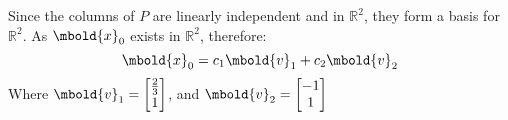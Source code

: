 \documentclass[12pt letter]{report}
\begin{document}
{  Since the columns of $P$ are linearly independent and in $\mathbb{R}^2$, they form a basis for $\mathbb{R}^2$. As
  $\mbold{x}_0$ exists in $\mathbb{R}^2$, therefore:
  \[
    \mbold{x}_0 = c_1 \mbold{v}_1 + c_2 \mbold{v}_2
  \]
  Where $\mbold{v}_1 = \begin{bmatrix} \frac{2}{3} \\ 1 \end{bmatrix} $, and $\mbold{v}_2 = \begin{bmatrix} -1 \\  1 \end{bmatrix} $



}

\end{document}
